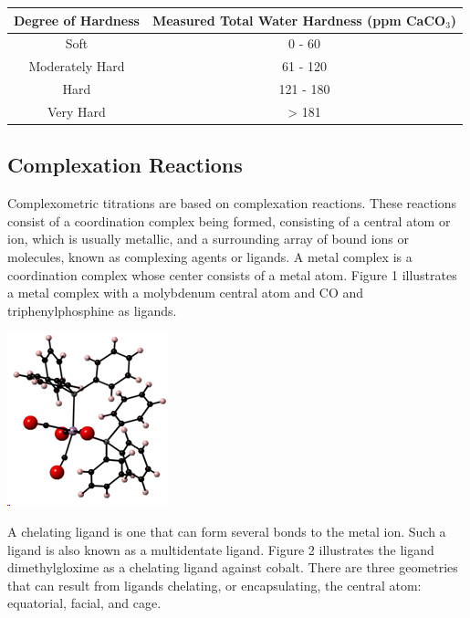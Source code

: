 \documentclass{article}
\begin{document}
\begin{center}
        \begin{tabular}{|c|c|}
                \hline
                \textbf{Degree of Hardness} & \textbf{Measured Total Water
                Hardness (ppm CaCO$_3$)} \\
                \hline
                Soft & 0 - 60 \\
                Moderately Hard & 61 - 120 \\
                Hard & 121 - 180 \\
                Very Hard & > 181 \\
                \hline
        \end{tabular}
\end{center}


\subsection {Complexation Reactions}
Complexometric titrations are based on complexation reactions. These reactions consist of a
coordination complex being formed, consisting of a central atom or ion, which is usually metallic,
and a surrounding array of bound ions or molecules, known as complexing agents or ligands. A metal
complex is a coordination complex whose center consists of a metal atom. Figure 1 illustrates a metal
complex with a molybdenum central atom and CO and triphenylphosphine as ligands.

\begin{center}
    \includegraphics[scale = 0.6]{structurecis}
\end{center}

A chelating ligand is one that can form several bonds to the metal ion. Such a ligand is also known
as a multidentate ligand.
Figure 2 illustrates the ligand dimethylgloxime as a chelating ligand against cobalt. There are
three geometries that can result from ligands chelating, or encapsulating, the central atom:
equatorial, facial, and cage.
\end{document}
